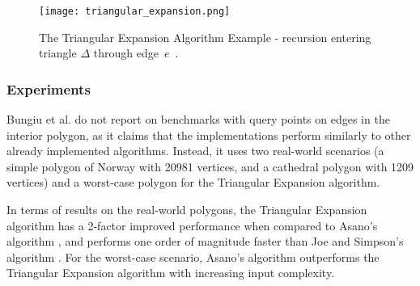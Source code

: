 \begin{figure}[h!]
	\centering
	\texttt{[image: triangular\_expansion.png]}
	\caption{The Triangular Expansion Algorithm Example - recursion entering triangle $\Delta$ through edge~$e$~\cite{DBLP:journals/corr/BungiuHHHK14}.}
	\label{fig:triangular}
\end{figure}

\subsubsection{Experiments}
Bungiu et al. do not report on benchmarks with query points on edges in the interior polygon, as it claims that the implementations perform similarly to other already implemented algorithms. Instead, it uses two real-world scenarios (a simple polygon of Norway with 20981 vertices, and a cathedral polygon with 1209 vertices) and a worst-case polygon for the Triangular Expansion algorithm.

In terms of results on the real-world polygons, the Triangular Expansion algorithm has a 2-factor improved performance when compared to Asano's algorithm \cite{asano1985efficient}, and performs one order of magnitude faster than Joe and Simpson's algorithm \cite{joe1987corrections}. For the worst-case scenario, Asano's algorithm \cite{asano1985efficient} outperforms the Triangular Expansion algorithm with increasing input complexity.

